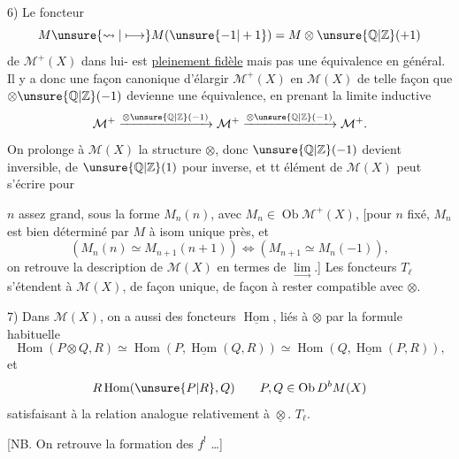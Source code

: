 6) 
Le foncteur
\[
M\unsure{\rightsquigarrow|\longmapsto}M(\unsure{-1|+1})=M\otimes\unsure{\mathbb{Q}|\mathbb{Z}}(+1)
\]
de $\mathcal{M}^+(X)$ dans lui- est \uline{pleinement fidèle}
mais pas une équivalence en général.
Il y a donc une façon canonique
d'élargir $\mathcal{M}^+(X)$ en $\mathcal{M}(X)$ de telle façon
que $\otimes\unsure{\mathbb{Q}|\mathbb{Z}}(-1)$ devienne une équivalence,
en prenant la limite inductive
\[
\mathcal{M}^+\xrightarrow{\otimes\unsure{\mathbb{Q}|\mathbb{Z}}(-1)}\mathcal{M}^+
\xrightarrow{\otimes\unsure{\mathbb{Q}|\mathbb{Z}}(-1)}\mathcal{M}^+.
\]
On prolonge
à $\mathcal{M}(X)$ la structure $\otimes$, donc $\unsure{\mathbb{Q}|\mathbb{Z}}(-1)$
devient inversible, de $\unsure{\mathbb{Q}|\mathbb{Z}}(1)$ pour inverse, et
tt élément de $\mathcal{M}(X)$ peut s'écrire pour

$n$ assez grand, sous la forme
$M_n(n)$, avec $M_n\in\operatorname{Ob}\mathcal{M}^+(X)$, [pour $n$ fixé,
$M_n$ est bien déterminé par $M$ à isom unique
près, et
\[
(M_n(n)\simeq M_{n+1}(n+1))\Longleftrightarrow(M_{n+1}\simeq M_n(-1)),
\]
on retrouve la description de $\mathcal{M}(X)$ en
termes de $\underset{\longrightarrow}{\lim}$.]
Les foncteurs
$T_\ell$ s'étendent à $\mathcal{M}(X)$, de façon unique, de façon
à rester compatible avec $\otimes$.

7) Dans $\mathcal{M}(X)$, on a aussi des foncteurs
$\underline{\operatorname{Hom}}$, liés à $\otimes$ par la formule
habituelle
\[
\operatorname{Hom}(P\otimes Q,R)\simeq
\operatorname{Hom}(P,\underline{\operatorname{Hom}}(Q,R))
\simeq\operatorname{Hom}(Q,\underline{\operatorname{Hom}}(P,R)),
\]
et 
\[
R\operatorname{Hom}(\unsure{P|R},Q)
\qquad P,Q\in\operatorname{Ob}D^bM(X)
\]
satisfaisant à la relation analogue
relativement à $\underline{\otimes}$.
 $T_\ell$.

 [NB. On retrouve la formation
des $f^!$ \ldots]

